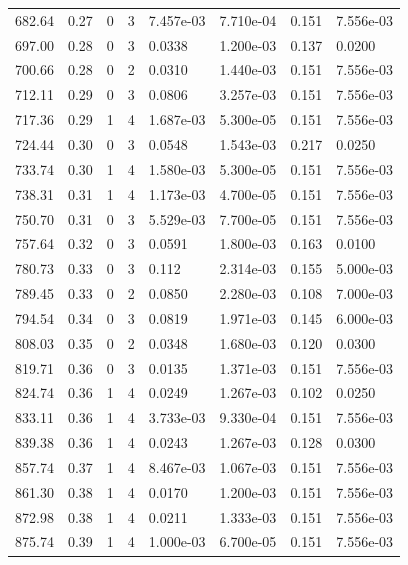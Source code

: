 \documentclass[preview]{standalone}
\begin{document}
{{{{\begin{tabular}{L{1.2cm}C{1.2cm} C{0.3cm}C{0.5cm} C{1.4cm}C{1.4cm} C{1.4cm}C{1.4cm}}
  682.64  &  0.27  & 0     &  3 &  7.457e-03  & 7.710e-04  & 0.151 &  7.556e-03   \\ 
  697.00  &  0.28  & 0     &  3 &  0.0338  & 1.200e-03  & 0.137 &  0.0200   \\ 
  700.66  &  0.28  & 0     &  2 &  0.0310  & 1.440e-03  & 0.151 &  7.556e-03   \\ 
  712.11  &  0.29  & 0     &  3 &  0.0806  & 3.257e-03  & 0.151 &  7.556e-03   \\ 
  717.36  &  0.29  & 1     &  4 &  1.687e-03  & 5.300e-05  & 0.151 &  7.556e-03   \\ 
  724.44  &  0.30  & 0     &  3 &  0.0548  & 1.543e-03  & 0.217 &  0.0250   \\ 
  733.74  &  0.30  & 1     &  4 &  1.580e-03  & 5.300e-05  & 0.151 &  7.556e-03   \\ 
  738.31  &  0.31  & 1     &  4 &  1.173e-03  & 4.700e-05  & 0.151 &  7.556e-03   \\ 
  750.70  &  0.31  & 0     &  3 &  5.529e-03  & 7.700e-05  & 0.151 &  7.556e-03   \\ 
  757.64  &  0.32  & 0     &  3 &  0.0591  & 1.800e-03  & 0.163 &  0.0100   \\ 
  780.73  &  0.33  & 0     &  3 &  0.112  & 2.314e-03  & 0.155 &  5.000e-03   \\ 
  789.45  &  0.33  & 0     &  2 &  0.0850  & 2.280e-03  & 0.108 &  7.000e-03   \\ 
  794.54  &  0.34  & 0     &  3 &  0.0819  & 1.971e-03  & 0.145 &  6.000e-03   \\ 
  808.03  &  0.35  & 0     &  2 &  0.0348  & 1.680e-03  & 0.120 &  0.0300   \\ 
  819.71  &  0.36  & 0     &  3 &  0.0135  & 1.371e-03  & 0.151 &  7.556e-03   \\ 
  824.74  &  0.36  & 1     &  4 &  0.0249  & 1.267e-03  & 0.102 &  0.0250   \\ 
  833.11  &  0.36  & 1     &  4 &  3.733e-03  & 9.330e-04  & 0.151 &  7.556e-03   \\ 
  839.38  &  0.36  & 1     &  4 &  0.0243  & 1.267e-03  & 0.128 &  0.0300   \\ 
  857.74  &  0.37  & 1     &  4 &  8.467e-03  & 1.067e-03  & 0.151 &  7.556e-03   \\ 
  861.30  &  0.38  & 1     &  4 &  0.0170  & 1.200e-03  & 0.151 &  7.556e-03   \\ 
  872.98  &  0.38  & 1     &  4 &  0.0211  & 1.333e-03  & 0.151 &  7.556e-03   \\ 
  875.74  &  0.39  & 1     &  4 &  1.000e-03  & 6.700e-05  & 0.151 &  7.556e-03   \\ 

\end{tabular}}}}}
\end{document}
